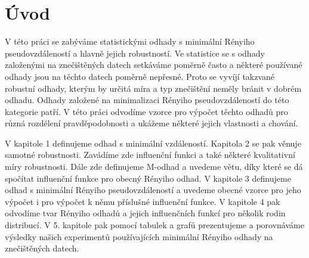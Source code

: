 \chapter*{Úvod}
 V této práci se zabýváme statistickými odhady s minimální Rényiho pseudovzdáleností a hlavně jejich robustností. Ve statistice se s odhady založenými na znečištěných datech setkáváme poměrně často a některé používané odhady jsou na těchto datech poměrně nepřesné. Proto se vyvíjí takzvané robustní odhady, kterým by určitá míra a typ znečištění neměly bránit v dobrém odhadu. Odhady založené na minimalizaci Rényiho pseudovzdáleností do této kategorie patří. V této práci odvodíme vzorce pro výpočet těchto odhadů pro různá rozdělení pravděpodobnosti a ukážeme některé jejich vlastnosti a chování. 
 
V kapitole 1 definujeme odhad s minimální vzdáleností. Kapitola 2 se pak věnuje samotné robustnosti. Zavádíme zde influenční funkci a také některé kvalitativní míry robustnosti. Dále zde definujeme M-odhad a uvedeme větu, díky které se dá spočítat influenční funkce pro obecný Rényiho odhad. V kapitole 3 definujeme odhad s minimální Rényiho pseudovzdáleností a uvedeme obecné vzorce pro jeho výpočet i pro výpočet k němu příslušné influenční funkce. V kapitole 4 pak odvodíme tvar Rényiho odhadů a jejich influenčních funkcí pro několik rodin distribucí. V 5. kapitole pak pomocí tabulek a grafů prezentujeme a porovnáváme výsledky našich experimentů používajících minimální Rényiho odhady na znečištěných datech.